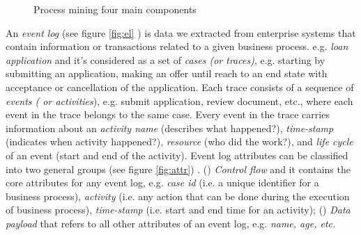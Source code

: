 
\begin{figure}[htb]
	\begin{center}
		\caption{Process mining four main components \cite{dumas2013fundamentals}}
		\label{fig:pm1}
	\end{center}
\end{figure}


An \textit{event log}  (see figure \ref{fig:el} ) is data we extracted from enterprise systems that contain information or transactions related to a given business process. e.g. \textit{loan application} and it’s considered as a set of \textit{cases (or traces)}, e.g. starting by submitting an application, making an offer until reach to an end state with acceptance or cancellation of the application. Each trace consists of a sequence of \textit{events ( or activities}), e.g. submit application, review document, etc., where each event in the trace belongs to the same case. Every event in the trace carries information about an \textit{activity name} (describes what happened?), \textit{time-stamp} (indicates when activity happened?), \textit{resource} (who did the work?), and \textit{life cycle} of an event (start and end of the activity). Event log attributes can be classified into two general groups (see figure \ref{fig:attr}) \cite{teinemaa2019outcome}. () \textit{Control flow} and it contains the core attributes for any event log, e.g. \textit{case id} (i.e. a unique identifier for a business process), \textit{activity} (i.e. any action that can be done during the execution of business process), \textit{time-stamp} (i.e. start and end time for an activity); () \textit{Data payload} that refers to all other attributes of an event log, e.g. \textit{name, age, etc.} 

